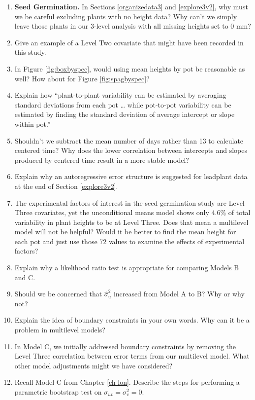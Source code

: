 \documentclass[
]{krantz}
\begin{document}
\begin{enumerate}
\def\labelenumi{\arabic{enumi}.}
\item
  \textbf{Seed Germination.} In Sections \ref{organizedata3} and \ref{explore3v2}, why must we be careful excluding plants with no height data? Why can't we simply leave those plants in our 3-level analysis with all missing heights set to 0 mm?
\item
  Give an example of a Level Two covariate that might have been recorded in this study.
\item
  In Figure \ref{fig:boxbyspec}, would using mean heights by pot be reasonable as well? How about for Figure \ref{fig:spagbyspec}?
\item
  Explain how ``plant-to-plant variability can be estimated by averaging standard deviations from each pot \ldots{} while pot-to-pot variability can be estimated by finding the standard deviation of average intercept or slope within pot.''
\item
  Shouldn't we subtract the mean number of days rather than 13 to calculate centered time? Why does the lower correlation between intercepts and slopes produced by centered time result in a more stable model?
\item
  Explain why an autoregressive error structure is suggested for leadplant data at the end of Section \ref{explore3v2}.
\item
  The experimental factors of interest in the seed germination study are Level Three covariates, yet the unconditional means model shows only 4.6\% of total variability in plant heights to be at Level Three. Does that mean a multilevel model will not be helpful? Would it be better to find the mean height for each pot and just use those 72 values to examine the effects of experimental factors?
\item
  Explain why a likelihood ratio test is appropriate for comparing Models B and C.
\item
  Should we be concerned that \(\hat{\sigma}_{u}^{2}\) increased from Model A to B? Why or why not?
\item
  Explain the idea of boundary constraints in your own words. Why can it be a problem in multilevel models?
\item
  In Model C, we initially addressed boundary constraints by removing the Level Three correlation between error terms from our multilevel model. What other model adjustments might we have considered?
\item
  Recall Model C from Chapter \ref{ch-lon}. Describe the steps for performing a parametric bootstrap test on \(\sigma_{uv} = \sigma_{v}^{2} = 0\).

\end{enumerate}
\end{document}
